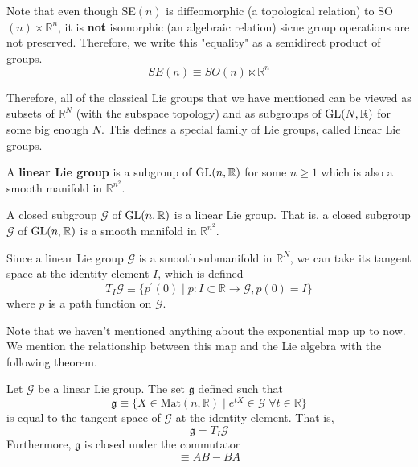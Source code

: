   Note that even though SE$(n)$ is diffeomorphic (a topological relation) to SO$(n) \times \mathbb{R}^n$, it is \textbf{not} isomorphic (an algebraic relation) sicne group operations are not preserved. Therefore, we write this "equality" as a semidirect product of groups. 
  \begin{equation}
    SE(n) \equiv SO(n) \ltimes \mathbb{R}^n
  \end{equation}

  Therefore, all of the classical Lie groups that we have mentioned can be viewed as subsets of $\mathbb{R}^N$ (with the subspace topology) and as subgroups of $\GL(N, \mathbb{R})$ for some big enough $N$. This defines a special family of Lie groups, called linear Lie groups. 

  \begin{definition}
    A \textbf{linear Lie group} is a subgroup of $\GL(n, \mathbb{R})$ for some $n \geq 1$ which is also a smooth manifold in $\mathbb{R}^{n^2}$. 
  \end{definition}

  \begin{theorem}
    A closed subgroup $\mathcal{G}$ of $\GL(n, \mathbb{R})$ is a linear Lie group. That is, a closed subgroup $\mathcal{G}$ of $\GL(n, \mathbb{R})$ is a smooth manifold in $\mathbb{R}^{n^2}$.
  \end{theorem}

  \begin{definition}
    Since a linear Lie group $\mathcal{G}$ is a smooth submanifold in $\mathbb{R}^N$, we can take its tangent space at the identity element $I$, which is defined 
    \begin{equation}
      T_I \mathcal{G} \equiv \{p^\prime (0) \;|\; p: I \subset \mathbb{R} \rightarrow \mathcal{G}, p(0) = I\}
    \end{equation}
    where $p$ is a path function on $\mathcal{G}$. 
  \end{definition}

  Note that we haven't mentioned anything about the exponential map up to now. We mention the relationship between this map and the Lie algebra with the following theorem. 

  \begin{theorem}
    Let $\mathcal{G}$ be a linear Lie group. The set $\mathfrak{g}$ defined such that
    \begin{equation}
      \mathfrak{g} \equiv \{X \in \text{Mat}(n, \mathbb{R}) \; | \; e^{t X} \in \mathcal{G} \; \forall t \in \mathbb{R}\}
    \end{equation}
    is equal to the tangent space of $\mathcal{G}$ at the identity element. That is, 
    \begin{equation}
      \mathfrak{g} = T_I \mathcal{G}
    \end{equation}
    Furthermore, $\mathfrak{g}$ is closed under the commutator 
    \begin{equation}
      [A,B] \equiv A B - B A
    \end{equation}
  \end{theorem}

